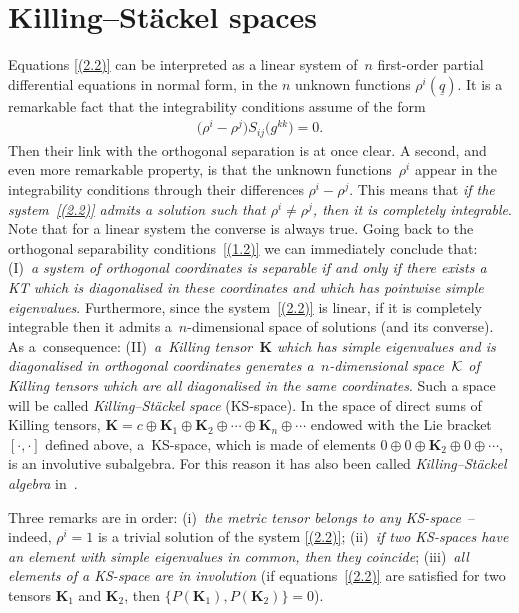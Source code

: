 \documentclass[pdftex]{sigma}
\def\bs{\boldsymbol}
\numberwithin{equation}{section}
\begin{document}
\section {Killing--St\"ackel spaces}\label{section3}

Equations \eqref{(2.2)} can be interpreted as a linear system of~$n$ f\/irst-order partial dif\/ferential equations in normal form, in the $n$ unknown functions $\rho^i(\underline q)$. It is a remarkable fact that the integrability conditions assume of the form
\begin{gather*}
\big(\rho^i-\rho^j\big) S_{ij}\big(g^{kk}\big)=0.
\end{gather*}
Then their link with the orthogonal separation is at once clear. A second, and even more remarkable property, is that the unknown functions~$\rho^i$ appear in the integrability conditions through their dif\/ferences $\rho^i-\rho^j$. This means that
{\it if the system~\eqref{(2.2)} admits a solution such that $\rho^i\neq\rho^j$, then it is completely integrable}. Note that for a linear system the converse is always true. Going back to the orthogonal separability conditions~\eqref{(1.2)} we can immediately conclude that: (I)~{\it a system of orthogonal coordinates is separable if and only if there exists a KT which is diagonalised in these coordinates and which has pointwise simple eigenvalues}. Furthermore, since the system~\eqref{(2.2)} is linear, if it is completely integrable then it admits a~$n$-dimensional space of solutions (and its converse). As a~consequence: (II)~{\it a~Killing tensor~$\bs K$ which has simple eigenvalues and is diagonalised in orthogonal coordinates generates a~$n$-dimensional spa\-ce~$\cal K$ of Killing tensors which are all diagonalised in the same coordinates}. Such a space will be called {\it Killing--St\"ackel space} (KS-space). In the space of direct sums of Killing tensors, ${\bs K}=c \oplus \bs K_1\oplus \bs K_2\oplus \cdots \oplus \bs K_n\oplus\cdots$ endowed with the Lie bracket $[\cdot,\cdot]$ def\/ined above, a~KS-space, which is made of elements $0\oplus 0\oplus \bs K_2\oplus 0\oplus\cdots$, is an involutive subalgebra. For this reason it has also been called {\it Killing--St\"ackel algebra} in~\cite{BCR-2002a,BCR-2002b}.

Three remarks are in order: (i)~{\it the metric tensor belongs to any KS-space}~-- indeed, $\rho^i=1$ is a trivial solution of the system \eqref{(2.2)}; (ii)~{\it if two KS-spaces have an element with simple eigenvalues in common,
then they coincide}; (iii)~{\it all elements of a KS-space are in involution}
(if equations~\eqref{(2.2)} are satisf\/ied for two tensors $\bs K_1$ and $\bs K_2$, then $\{P(\bs K_1),P(\bs K_2)\}=0$).
\end{document}
